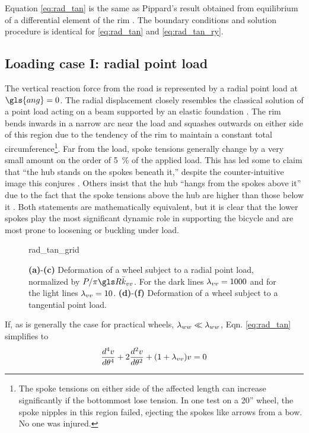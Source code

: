 \documentclass[\rootdir/thesis.tex]{subfiles}
\begin{document}
Equation \eqref{eq:rad_tan} is the same as Pippard’s result obtained from equilibrium of a differential element of the rim \cite{Pippard1932b}. The boundary conditions and solution procedure is identical for \eqref{eq:rad_tan} and \eqref{eq:rad_tan_ry}.

\subsection{Loading case I: radial point load}

The vertical reaction force from the road is represented by a radial point load at $\gls{ang}=0$. The radial displacement closely resembles the classical solution of a point load acting on a beam supported by an elastic foundation \cite{Hetenyi1946}. The rim bends inwards in a narrow arc near the load and squashes outwards on either side of this region due to the tendency of the rim to maintain a constant total circumference\footnote{The spoke tensions on either side of the affected length can increase significantly if the bottommost lose tension. In one test on a 20'' wheel, the spoke nipples in this region failed, ejecting the spokes like arrows from a bow. No one was injured.}. Far from the load, spoke tensions generally change by a very small amount on the order of \SI{5}{\percent} of the applied load. This has led some to claim that ``the hub stands on the spokes beneath it,'' despite the counter-intuitive image this conjures \cite{Brandt1993,Forester1980}. Others insist that the hub ``hangs from the spokes above it'' due to the fact that the spoke tensions above the hub are higher than those below it \cite{Fine1998}. Both statements are mathematically equivalent, but it is clear that the lower spokes play the most significant dynamic role in supporting the bicycle and are most prone to loosening or buckling under load.

\begin{figure}
\centering
{rad_tan_grid}
\caption[Radial-tangential deformation of the wheel]{\textbf{(a)}-\textbf{(c)} Deformation of a wheel subject to a radial point load, normalized by $P/\pi\R\kvv$. For the dark lines $\lambda_{vv}=1000$ and for the light lines $\lambda_{vv}=10$. \textbf{(d)}-\textbf{(f)} Deformation of a wheel subject to a tangential point load.}
\label{fig:rad_tan_grid}
\end{figure}

If, as is generally the case for practical wheels, $\lambda_{ww} \ll \lambda_{ww}$, Eqn. \eqref{eq:rad_tan} simplifies to
\begin{equation}
\label{eq:rad}
\frac{d^4v}{d\theta^4} + 2\frac{d^2v}{d\theta^2} + (1+\lambda_{vv})v=0
\end{equation}
\end{document}
